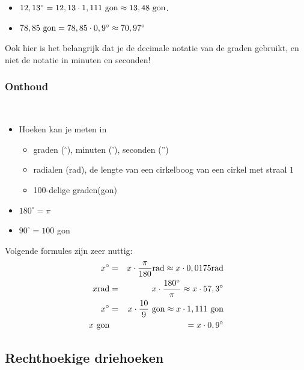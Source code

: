 \begin{voorbeeld}
	
\begin{itemize}
	\item $12,13^\circ = 12,13 \cdot 1,111 \textup{ gon} \approx 13,48 \textup{ gon}$.
	\item $78,85 \textup{ gon} = 78,85 \cdot 0,9^\circ \approx 70,97^\circ$
\end{itemize}

\end{voorbeeld}
Ook hier is het belangrijk dat je de decimale notatie van de graden gebruikt, en niet de notatie in minuten en seconden!

\subsubsection{Onthoud}
\ \\
\begin{onthoud}
	\begin{itemize}
	\item Hoeken kan je meten in
	
\begin{itemize}
	\item graden ($^\circ$), minuten ('), seconden ('')
	\item radialen (rad), de lengte van een cirkelboog van een cirkel met straal $1$
	\item 100-delige graden(gon)
\end{itemize}
\item $180^\circ=\pi$
\item $90^\circ=100$ gon
\end{itemize}

Volgende formules zijn zeer nuttig:
\begin{eqnarray*}
x^\circ &=& x\cdot \frac{\pi}{180} \text{rad} \approx x\cdot 0,0175 \text{rad}\\
x \text{rad} &=& x \cdot \frac{180^\circ}{\pi} \approx x \cdot 57,3^\circ\\
x^\circ &=& x \cdot \frac{10}{9} \textup{ gon} \approx x \cdot 1,111 \textup{ gon}\\
x \textup{ gon} &&= x\cdot 0,9^\circ
\end{eqnarray*}
\end{onthoud}


\subsection{Rechthoekige driehoeken}

